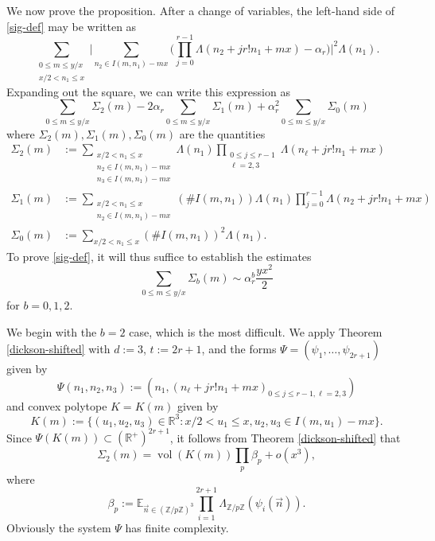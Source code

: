 \documentclass[11pt]{amsart}
\numberwithin{equation}{section}  %
\theoremstyle{remark}
\theoremstyle{plain}
\numberwithin{equation}{section}
\newcommand{\Z}{\mathbb{Z}}
\newcommand{\R}{\mathbb{R}}
\newcommand{\E}{\mathbb{E}}  %
\renewcommand{\le}{\leqslant}
\renewcommand{\leq}{\leqslant}
\renewcommand{\(}{\left(}
\renewcommand{\)}{\right)}
\newcommand{\asym}{\sim}   %
\newcommand{\vect}[1]{{\ensuremath{\vec{#1}}}}
\newcommand{\vol}{\operatorname{vol}}
\begin{document}
We now prove the proposition.  After a change of variables, the left-hand side of \eqref{sig-def} may be written as
\[
\sum_{\substack{0 \leq m \leq y/x \\x/2 < n_1 \le x}} \Bigg|\sum_{n_2 \in I(m, n_1) - mx } \Bigg(\prod_{j = 0}^{r-1}\Lambda(n_2 + jr! n_1 + mx)  - \alpha_r\Bigg) \Bigg|^2 \Lambda(n_1).\]
Expanding out the square, we can write this expression as
\[ \sum_{0 \leq m \leq y/x} \Sigma_2(m) - 2\alpha_r \sum_{0 \leq m
  \leq y/x} \Sigma_1(m) + \alpha_r^2 \sum_{0 \leq m \leq y/x}
\Sigma_0(m)\]
 where $\Sigma_2(m), \Sigma_1(m), \Sigma_0(m)$ are the quantities
\begin{align*}
\Sigma_2(m)  &:=  \sum_{\substack{x/2 < n_1 \le x \\n_2 \in I(m, n_1) - mx \\ n_3 \in I(m,n_1) - mx }}  \Lambda(n_1) \prod_{\substack{0 \leq j \leq r-1 \\ \ell = 2,3}}\Lambda(n_{\ell} + jr! n_1 + mx)\\
\Sigma_1(m) &:=  \sum_{\substack{x/2 < n_1 \le x \\ n_2 \in I(m, n_1) - mx }} (\# I(m,n_1)) \Lambda(n_1)  \prod_{j = 0}^{r-1} \Lambda(n_2 + jr! n_1 + mx)\\
\Sigma_0(m) &:= \sum_{x/2 < n_1 \le x} (\# I(m,n_1))^2 \Lambda(n_1).
\end{align*}
To prove \eqref{sig-def}, it will thus suffice to establish the estimates
\begin{equation}\label{sigo}
\sum_{0 \leq m \leq y/x} \Sigma_b(m) \asym \alpha_r^b \frac{yx^2}{2}
\end{equation}
for $b=0,1,2$.

We begin with the $b=2$ case, which is the most difficult.  We apply Theorem \ref{dickson-shifted} with $d := 3$, $t := 2r + 1$, and the forms $\Psi = (\psi_1,\dots, \psi_{2r+1})$ given by
\[ \Psi(n_1,n_2,n_3) := (n_1,  (n_{\ell} + jr! n_1 + mx)_{0 \leq j \leq r-1, \ell =
  2,3})\] and convex polytope $K = K(m)$ given by
\[ K(m) := \{ (u_1,u_2,u_3) \in \R^3 : x/2 < u_1 \le x, u_2,u_3 \in I(m,u_1) - mx \}. \]
 Since $\Psi(K(m)) \subset (\R^{+})^{2r + 1}$, it follows from Theorem \ref{dickson-shifted} that
\begin{equation}\label{sig-2m} \Sigma_2(m) = \vol(K(m)) \prod_p \beta_p + o(x^3),\end{equation}
where
\[ \beta_p := \E_{\vect{n} \in (\Z/p\Z)^3} \prod_{i = 1}^{2r +1} \Lambda_{\Z/p\Z}(\psi_i(\vect{n})).\]
Obviously the system $\Psi$ has finite complexity.
\end{document}
